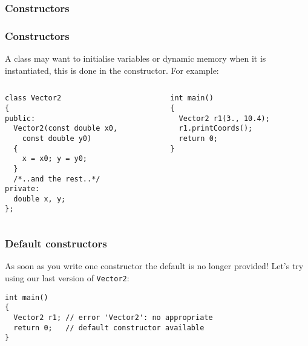 \documentclass{beamer}
\begin{document}
\subsubsection{Constructors}

\begin{frame}[fragile]
  \frametitle{Constructors}
  
  A class may want to initialise variables or dynamic memory when it is instantiated, this is done in the constructor.
  \pause
  For example:
  \begin{columns}[t]
    \begin{column}[T]{0.5\linewidth}
      \begin{lstlisting}[aboveskip=0pt,belowskip=0pt]
class Vector2
{
public:
  Vector2(const double x0,
    const double y0)
  {
    x = x0; y = y0;
  }
  /*..and the rest..*/
private:
  double x, y;
};
      \end{lstlisting}
    \end{column}
    \begin{column}[T]{0.5\linewidth}
      \begin{lstlisting}[aboveskip=0pt,belowskip=0pt]
int main()
{
  Vector2 r1(3., 10.4);
  r1.printCoords();
  return 0;
}
      \end{lstlisting}
    \end{column}
  \end{columns}  
	
\end{frame}

\begin{frame}[fragile]
  \frametitle{Default constructors}
  
  As soon as you write one constructor the default is no longer provided!\newline
  \pause
  Let's try using our last version of \texttt{Vector2}:
  \begin{lstlisting}
int main()
{
  Vector2 r1; // error 'Vector2': no appropriate
  return 0;	  // default constructor available
}
  \end{lstlisting}

\end{frame}
\end{document}
